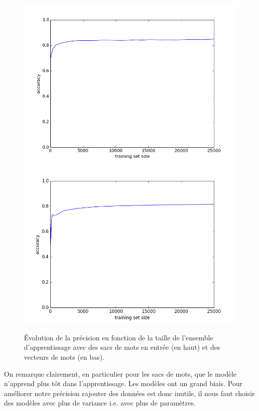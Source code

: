 \documentclass{article}
\begin{document}
\begin{figure}[h]
\begin{center}
\includegraphics[scale=0.5]{images/learning_curve_lr_bow.png} \\
\includegraphics[scale=0.5]{images/learning_curve_lr_vec.png}
\caption{Évolution de la précision en fonction de la taille de l'ensemble d'apprentissage avec des sacs de mots en entrée (en haut) et des vecteurs de mots (en bas).}
\label{learning_curves}
\end{center}
\end{figure}

On remarque clairement, en particulier pour les sacs de mots, que le modèle n'apprend plus tôt dans l'apprentissage. Les modèles ont un grand biais. Pour améliorer notre précision rajouter des données est donc inutile, il nous faut choisir des modèles avec plus de variance i.e. avec plus de paramètres.
\end{document}
